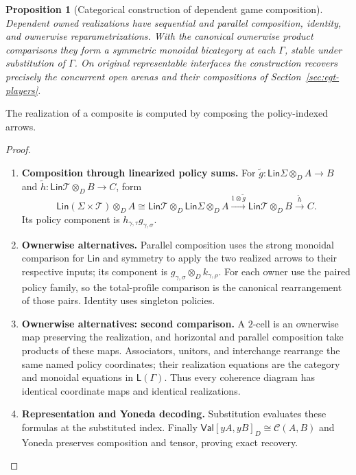 \documentclass[11pt,a4paper]{article}
\numberwithin{equation}{section}
\newtheorem{proposition}[theorem]{Proposition}
\theoremstyle{definition}
\theoremstyle{remark}
\theoremstyle{plain}
\begin{document}
\begin{proposition}[Categorical construction of dependent game composition]
\label{prop:egt-dependent-game-composition}
Dependent owned realizations have sequential and parallel composition,
identity, and ownerwise reparametrizations. With the canonical ownerwise
product comparisons they form a symmetric monoidal bicategory at each
$\Gamma$, stable under substitution of $\Gamma$.
On original representable interfaces the construction recovers precisely
the concurrent open arenas and their compositions of
Section~\ref{sec:egt-players}.
\end{proposition}

\noindent The realization of a composite is computed by composing the policy-indexed arrows.
\begin{center}
\end{center}


\begin{proof}
\leavevmode
\begin{enumerate}[label=\textup{(\arabic*)},leftmargin=*,itemsep=4pt,topsep=3pt]
  \item \textbf{Composition through linearized policy sums.} For $\widetilde g:\mathsf{Lin}\Sigma\otimes_D A\to B$ and
$\widetilde h:\mathsf{Lin}\mathcal T\otimes_D B\to C$, form
\[
 \mathsf{Lin}(\Sigma\times\mathcal T)\otimes_D A
 \cong\mathsf{Lin}\mathcal T\otimes_D\mathsf{Lin}\Sigma\otimes_D A
 \xrightarrow{1\otimes\widetilde g}
 \mathsf{Lin}\mathcal T\otimes_D B
 \xrightarrow{\widetilde h}C.
\]
Its policy component is $h_{\gamma,\tau}g_{\gamma,\sigma}$.
  \item \textbf{Ownerwise alternatives.} Parallel composition uses the strong monoidal comparison for
$\mathsf{Lin}$ and symmetry to apply the two realized arrows to their
respective inputs; its component is
$g_{\gamma,\sigma}\otimes_D k_{\gamma,\rho}$. For each owner use the paired policy family, so the total-profile
comparison is the canonical rearrangement of those pairs. Identity uses
singleton policies.
  \item \textbf{Ownerwise alternatives: second comparison.} A $2$-cell is an ownerwise map preserving the
realization, and horizontal and parallel composition take products of
these maps. Associators, unitors, and interchange rearrange the same
named policy coordinates; their realization equations are the category
and monoidal equations in $\mathsf L(\Gamma)$. Thus every coherence
diagram has identical coordinate maps and identical realizations.
  \item \textbf{Representation and Yoneda decoding.} Substitution evaluates these formulas at the substituted index. Finally $\mathsf{Val}[yA,yB]_D\cong\mathcal C(A,B)$ and Yoneda
preserves composition and tensor, proving exact recovery.
\end{enumerate}
\end{proof}
\end{document}
